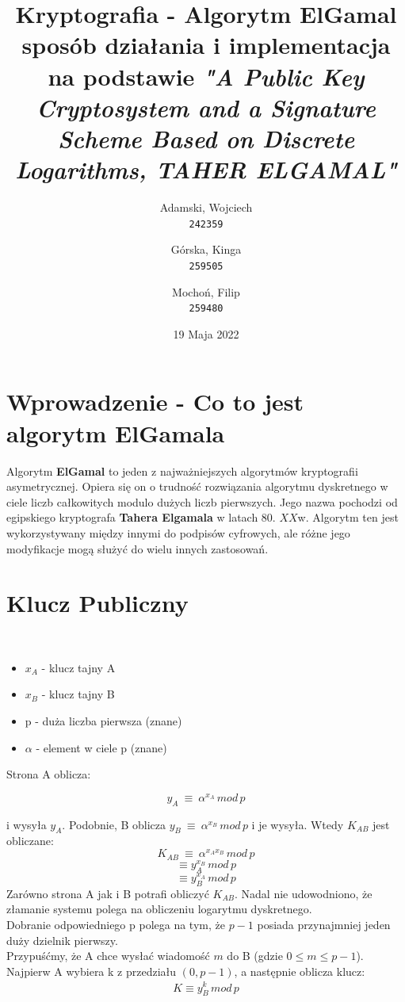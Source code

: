 \documentclass[12pt,a4paper]{article}
\begin{document}
\title{
  Kryptografia - Algorytm ElGamal \\
   sposób działania i implementacja \\
    \small na podstawie \textit{"A Public Key Cryptosystem and a Signature
Scheme Based on Discrete Logarithms, 
TAHER ELGAMAL"}}

\author{
  Adamski, Wojciech\\
  \texttt{242359}
  \and
  Górska, Kinga\\
  \texttt{259505}
  \and
  Mochoń, Filip\\
  \texttt{259480}
}
\date{19 Maja 2022}
\maketitle
\tableofcontents
\newpage
\section{Wprowadzenie - Co to jest algorytm ElGamala}
Algorytm \textbf{ElGamal} to jeden z najważniejszych algorytmów kryptografii asymetrycznej. Opiera się on o trudność rozwiązania algorytmu dyskretnego w ciele liczb całkowitych modulo dużych liczb pierwszych. Jego nazwa pochodzi od egipskiego kryptografa \textbf{Tahera Elgamala} w latach 80. $XX$w. Algorytm ten jest wykorzystywany między innymi do podpisów cyfrowych, ale różne jego modyfikacje mogą służyć do wielu innych zastosowań.
\section{Klucz Publiczny}\
\begin{itemize}
\item $x_{A}$  - klucz tajny A 
\item $x_{B}$ - klucz tajny B  
\item p - duża liczba pierwsza (znane)
\item $\alpha$ - element w ciele p (znane)
\end{itemize}
 Strona A oblicza: 
 
     \[y_{A} \:\equiv\: \alpha^{x_{A}}\, mod\, p \]

 i wysyła $y_{A}$. Podobnie, B oblicza $y_{B} \:\equiv\: \alpha^{x_{B}}\, mod\, p$ i je wysyła.
 Wtedy $K_{AB}$ jest obliczane: 
 \[K_{AB}\:\equiv\:\alpha^{x_{A}x_{B}}\,mod\,p\]
   \[ \equiv y_{A}^{x_{B}}\,mod\,p\]
 \[\equiv y_{B}^{x_{A}}\,mod\,p\]
 Zarówno strona A jak i B potrafi obliczyć $K_{AB}$. Nadal nie udowodniono, że złamanie systemu polega na obliczeniu logarytmu dyskretnego. \\
 Dobranie odpowiedniego p polega na tym, że $p-1$ posiada przynajmniej jeden duży dzielnik pierwszy.\\
 Przypuśćmy, że A chce wysłać wiadomość $m$ do B (gdzie $0 \leq m \leq p-1$). Najpierw A wybiera k z przedziału $(0,p-1)$, a następnie oblicza klucz:
 \begin{gather}
    K\equiv y_{B}^{k}\,mod\,p 
 \end{gather}
 
\end{document}
